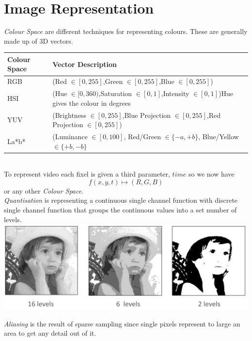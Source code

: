 \documentclass[11pt,a4paper]{article}
\begin{document}
\section{Image Representation}

\textit{Colour Space} are different techniques for representing colours. These are generally made up of 3D vectors.\\
\begin{tabular}{|l|L{13}|}
\hline
Colour Space&Vector Description\\
\hline
RGB&(Red $\in[0,255]$,Green $\in[0,255]$,Blue $\in[0,255]$)\\
HSI&(Hue $\in[0,360)$,Saturation $\in[0,1]$,Intensity $\in[0,1]$)\newline Hue gives the colour in degrees\\
YUV&(Brightness $\in[0,255]$,Blue Projection $\in[0,255]$,Red Projection $\in[0,255]$)\\
La*b*&(Luminance $\in[0,100]$, Red/Green $\in\{-a,+b\}$, Blue/Yellow $\in\{+b,-b\}$\\
\hline
\end{tabular}\\

To represent video each fixel is given a third parameter, $time$ so we now have
$$f(x,y,t)\mapsto(R,G,B)$$
or any other \textit{Colour Space}.\\

\textit{Quantisation} is representing a continuous single channel function with discrete single channel function that groups the continuous values into a set number of levels.\\

\includegraphics[scale=.3]{img/quantisation.png}

\textit{Aliasing} is the result of sparse sampling since single pixels represent to large an area to get any detail out of it.\\
\end{document}
